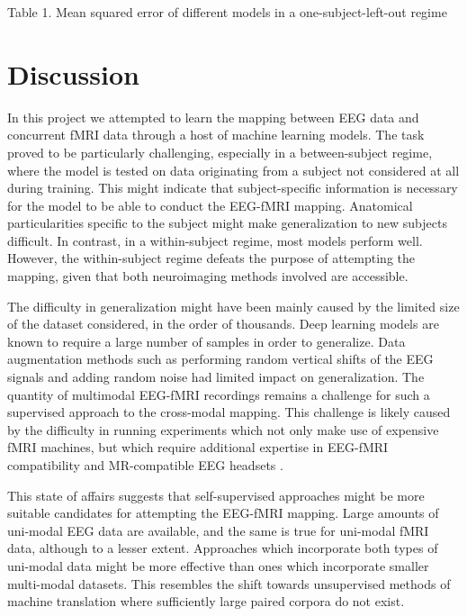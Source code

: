 \documentclass{article}
\begin{document}
\begin{center}
    Table 1. Mean squared error of different models in a one-subject-left-out regime
\end{center}

\section{Discussion}

In this project we attempted to learn the mapping between EEG data and concurrent fMRI data through a host of machine learning models. The task proved to be particularly challenging, especially in a between-subject regime, where the model is tested on data originating from a subject not considered at all during training. This might indicate that subject-specific information is necessary for the model to be able to conduct the EEG-fMRI mapping. Anatomical particularities specific to the subject might make generalization to new subjects difficult. In contrast, in a within-subject regime, most models perform well. However, the within-subject regime defeats the purpose of attempting the mapping, given that both neuroimaging methods involved are accessible.

The difficulty in generalization might have been mainly caused by the limited size of the dataset considered, in the order of thousands. Deep learning models are known to require a large number of samples in order to generalize. Data augmentation methods such as performing random vertical shifts of the EEG signals and adding random noise had limited impact on generalization. The quantity of multimodal EEG-fMRI recordings remains a challenge for such a supervised approach to the cross-modal mapping. This challenge is likely caused by the difficulty in running experiments which not only make use of expensive fMRI machines, but which require additional expertise in EEG-fMRI compatibility and MR-compatible EEG headsets \cite{calhas_eeg_2020}.

This state of affairs suggests that self-supervised approaches might be more suitable candidates for attempting the EEG-fMRI mapping. Large amounts of uni-modal EEG data are available, and the same is true for uni-modal fMRI data, although to a lesser extent. Approaches which incorporate both types of uni-modal data might be more effective than ones which incorporate smaller multi-modal datasets. This resembles the shift towards unsupervised methods of machine translation where sufficiently large paired corpora do not exist.
\end{document}

